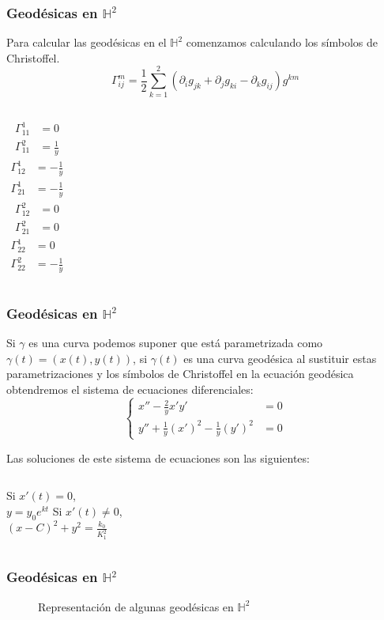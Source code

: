 \begin{frame}
	\frametitle{Geodésicas en $\mathbb{H}^2$}
	Para calcular las geodésicas en el $\mathbb{H}^{2}$ comenzamos calculando los símbolos de Christoffel. \pause
	\[
		\Gamma_{ij}^{m} = \frac{1}{2} \sum_{k=1}^{2}(\partial_{i} g_{jk} + \partial_{j} g_{ki} - \partial_{k}g_{ij})g^{km}
	\]\pause

	\begin{columns}[t]
		\begin{align*}
			\Gamma_{11}^{1} & = 0           \\[12pt]
			\Gamma_{11}^{2} & = \frac{1}{y}
		\end{align*}
		\begin{align*}
			\Gamma_{12}^{1} & = -\frac{1}{y} \\[12pt]
			\Gamma_{21}^{1} & = -\frac{1}{y}
		\end{align*}
		\begin{align*}
			\Gamma_{12}^{2} & = 0 \\[24pt]
			\Gamma_{21}^{2} & = 0
		\end{align*}
		\begin{align*}
			\Gamma_{22}^{1} & = 0            \\[12pt]
			\Gamma_{22}^{2} & = -\frac{1}{y}
		\end{align*}
	\end{columns}
\end{frame}

\begin{frame}
	\frametitle{Geodésicas en $\mathbb{H}^2$}
	Si $\gamma$ es una curva podemos suponer que está parametrizada como $\gamma(t) = (x(t),y(t))$, \pause si $\gamma(t)$ es una curva geodésica al sustituir estas parametrizaciones y los símbolos de Christoffel en la ecuación geodésica obtendremos el sistema de ecuaciones diferenciales:
	\[
		\begin{cases}
			x'' - \frac{2}{y} x'y'                         & = 0 \\[12pt]
			y'' + \frac{1}{y} (x')^2 - \frac{1}{y}(y')^{2} & = 0
		\end{cases}
	\] \pause

	Las soluciones de este sistema de ecuaciones son las siguientes:
	\vspace{12pt}
	\begin{columns}
		\centering
		Si $x'(t) = 0$, \\[12pt]
		$y = y_{0}e^{kt}$
		 \pause
		\centering
		Si $x'(t) \neq 0$, \\[12pt]
		$(x - C)^{2} + y^{2} = \frac{k_0}{K_{1}^{2}}$
	\end{columns}
\end{frame}

\begin{frame}
	\frametitle{Geodésicas en $\mathbb{H}^2$}
	\begin{figure}[h]
		\centering
		
		\caption{Representación de algunas geodésicas en $\mathbb{H}^{2}$}
	\end{figure}
\end{frame}
